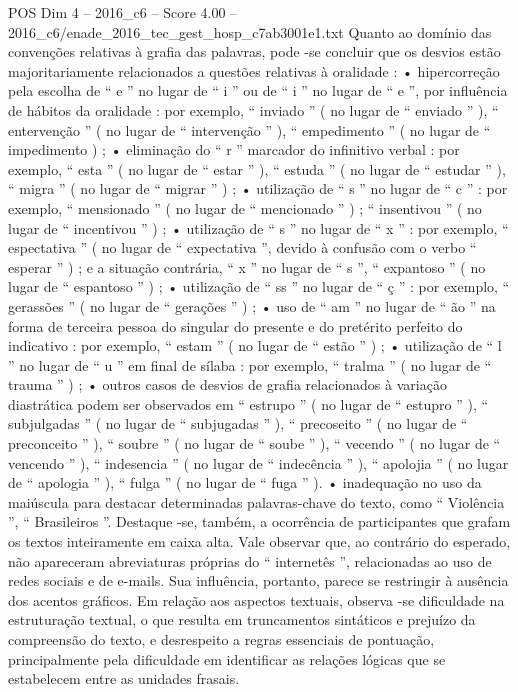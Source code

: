 \begin{textsample}{POS Dim 4 – 2016\_c6 – Score 4.00 – 2016\_c6/enade\_2016\_tec\_gest\_hosp\_c7ab3001e1.txt}
Quanto ao domínio das convenções relativas à grafia das palavras, pode -se concluir que os desvios estão majoritariamente relacionados a questões relativas à oralidade : • hipercorreção pela escolha de “ e ” no lugar de “ i ” ou de “ i ” no lugar de “ e ”, por influência de hábitos da oralidade : por exemplo, “ inviado ” ( no lugar de “ enviado ” ), “ entervenção ” ( no lugar de “ intervenção ” ), “ empedimento ” ( no lugar de “ impedimento ) ; • eliminação do “ r ” marcador do infinitivo verbal : por exemplo, “ esta ” ( no lugar de “ estar ” ), “ estuda ” ( no lugar de “ estudar ” ), “ migra ” ( no lugar de “ migrar ” ) ; • utilização de “ s ” no lugar de “ c ” : por exemplo, “ mensionado ” ( no lugar de “ mencionado ” ) ; “ insentivou ” ( no lugar de “ incentivou ” ) ; • utilização de “ s ” no lugar de “ x ” : por exemplo, “ espectativa ” ( no lugar de “ expectativa ”, devido à confusão com o verbo “ esperar ” ) ; e a situação contrária, “ x ” no lugar de “ s ”, “ expantoso ” ( no lugar de “ espantoso ” ) ; • utilização de “ ss ” no lugar de “ ç ” : por exemplo, “ gerassões ” ( no lugar de “ gerações ” ) ; • uso de “ am ” no lugar de “ ão ” na forma de terceira pessoa do singular do presente e do pretérito perfeito do indicativo : por exemplo, “ estam ” ( no lugar de “ estão ” ) ; • utilização de “ l ” no lugar de “ u ” em final de sílaba : por exemplo, “ tralma ” ( no lugar de “ trauma ” ) ; • outros casos de desvios de grafia relacionados à variação diastrática podem ser observados em “ estrupo ” ( no lugar de “ estupro ” ), “ subjulgadas ” ( no lugar de “ subjugadas ” ), “ precoseito ” ( no lugar de “ preconceito ” ), “ soubre ” ( no lugar de “ soube ” ), “ vecendo ” ( no lugar de “ vencendo ” ), “ indesencia ” ( no lugar de “ indecência ” ), “ apolojia ” ( no lugar de “ apologia ” ), “ fulga ” ( no lugar de “ fuga ” ). • inadequação no uso da maiúscula para destacar determinadas palavras-chave do texto, como “ Violência ”, “ Brasileiros ”.
Destaque -se, também, a ocorrência de participantes que grafam os textos inteiramente em caixa alta.
Vale observar que, ao contrário do esperado, não apareceram abreviaturas próprias do “ internetês ”, relacionadas ao uso de redes sociais e de e-mails.
Sua influência, portanto, parece se restringir à ausência dos acentos gráficos.
Em relação aos aspectos textuais, observa -se dificuldade na estruturação textual, o que resulta em truncamentos sintáticos e prejuízo da compreensão do texto, e desrespeito a regras essenciais de pontuação, principalmente pela dificuldade em identificar as relações lógicas que se estabelecem entre as unidades frasais.

\end{textsample}
